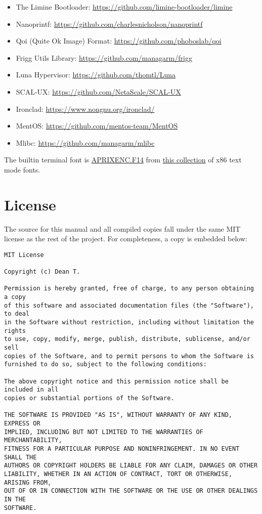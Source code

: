 \begin{itemize}
    \item The Limine Bootloader: \url{https://github.com/limine-bootloader/limine}
    \item Nanoprintf: \url{https://github.com/charlesnicholson/nanoprintf}
    \item Qoi (Quite Ok Image) Format: \url{https://github.com/phoboslab/qoi}
    \item Frigg Utils Library: \url{https://github.com/managarm/frigg}
    \item Luna Hypervisor: \url{https://github.com/thomtl/Luna}
    \item SCAL-UX: \url{https://github.com/NetaScale/SCAL-UX}
    \item Ironclad: \url{https://www.nongnu.org/ironclad/}
    \item MentOS: \url{https://github.com/mentos-team/MentOS}
    \item Mlibc: \url{https://github.com/managarm/mlibc}
\end{itemize}

The builtin terminal font is \href{https://github.com/viler-int10h/vga-text-mode-fonts/blob/master/FONTS/NON-PC/APRIXENC.F14}{APRIXENC.F14} from \href{https://github.com/viler-int10h/vga-text-mode-fonts}{this collection} of x86 text mode fonts.

\section{License}

The source for this manual and all compiled copies fall under the same MIT license as the rest of the project. For completeness, a copy is embedded below:

\begin{verbatim}
MIT License

Copyright (c) Dean T.

Permission is hereby granted, free of charge, to any person obtaining a copy
of this software and associated documentation files (the "Software"), to deal
in the Software without restriction, including without limitation the rights
to use, copy, modify, merge, publish, distribute, sublicense, and/or sell
copies of the Software, and to permit persons to whom the Software is
furnished to do so, subject to the following conditions:

The above copyright notice and this permission notice shall be included in all
copies or substantial portions of the Software.

THE SOFTWARE IS PROVIDED "AS IS", WITHOUT WARRANTY OF ANY KIND, EXPRESS OR
IMPLIED, INCLUDING BUT NOT LIMITED TO THE WARRANTIES OF MERCHANTABILITY,
FITNESS FOR A PARTICULAR PURPOSE AND NONINFRINGEMENT. IN NO EVENT SHALL THE
AUTHORS OR COPYRIGHT HOLDERS BE LIABLE FOR ANY CLAIM, DAMAGES OR OTHER
LIABILITY, WHETHER IN AN ACTION OF CONTRACT, TORT OR OTHERWISE, ARISING FROM,
OUT OF OR IN CONNECTION WITH THE SOFTWARE OR THE USE OR OTHER DEALINGS IN THE
SOFTWARE.
\end{verbatim}

